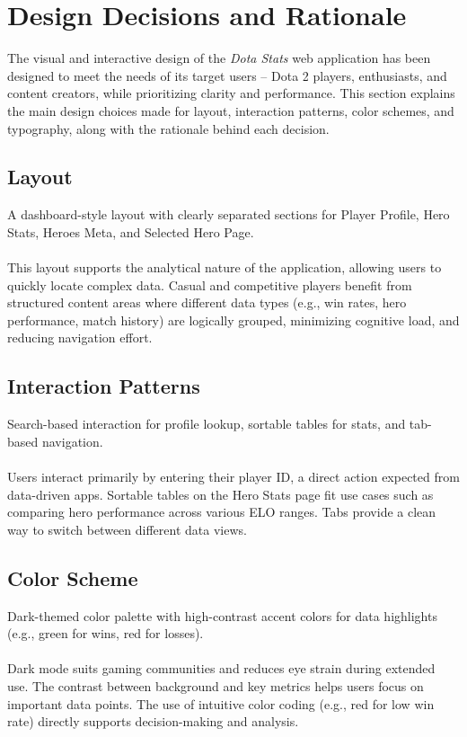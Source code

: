 \section{Design Decisions and Rationale}

The visual and interactive design of the \textit{Dota Stats} web application has been designed to meet the needs of its target users -- Dota 2 players, enthusiasts, and content creators, while prioritizing clarity and performance. This section explains the main design choices made for layout, interaction patterns, color schemes, and typography, along with the rationale behind each decision.

\subsection{Layout}

A dashboard-style layout with clearly separated sections for Player Profile, Hero Stats, Heroes Meta, and Selected Hero Page.
\\
\\
This layout supports the analytical nature of the application, allowing users to quickly locate complex data. Casual and competitive players benefit from structured content areas where different data types (e.g., win rates, hero performance, match history) are logically grouped, minimizing cognitive load, and reducing navigation effort.

\subsection{Interaction Patterns}

Search-based interaction for profile lookup, sortable tables for stats, and tab-based navigation.
\\
\\
Users interact primarily by entering their player ID, a direct action expected from data-driven apps. Sortable tables on the Hero Stats page fit use cases such as comparing hero performance across various ELO ranges. Tabs provide a clean way to switch between different data views.

\subsection{Color Scheme}

Dark-themed color palette with high-contrast accent colors for data highlights (e.g., green for wins, red for losses).
\\
\\
Dark mode suits gaming communities and reduces eye strain during extended use. The contrast between background and key metrics helps users focus on important data points. The use of intuitive color coding (e.g., red for low win rate) directly supports decision-making and analysis.

